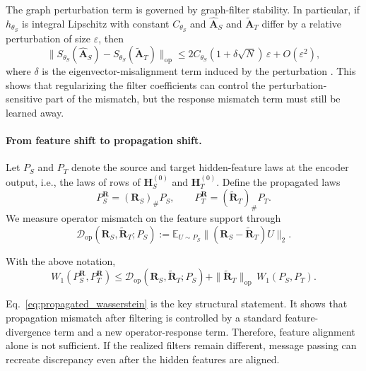 \documentclass[runningheads]{llncs}
\def\mA{{\mathbf{A}}}
\def\mH{{\mathbf{H}}}
\def\mR{{\mathbf{R}}}
\begin{document}
The graph perturbation term is governed by graph-filter stability. In particular, if $h_{\theta_S}$ is integral Lipschitz with constant $C_{\theta_S}$ and $\widehat{\mA}_S$ and $\widetilde{\mA}_T$ differ by a relative perturbation of size $\varepsilon$, then
\begin{equation}
\|S_{\theta_S}(\widehat{\mA}_S)-S_{\theta_S}(\widetilde{\mA}_T)\|_{\mathrm{op}}
\le
2C_{\theta_S}(1+\delta\sqrt{N})\,\varepsilon + O(\varepsilon^2),
\label{eq:stability_bound}
\end{equation}
where $\delta$ is the eigenvector-misalignment term induced by the perturbation \cite{gnn_stability}. This shows that regularizing the filter coefficients can control the perturbation-sensitive part of the mismatch, but the response mismatch term must still be learned away.

\paragraph{From feature shift to propagation shift.}
Let $P_S$ and $P_T$ denote the source and target hidden-feature laws at the encoder output, i.e., the laws of rows of $\mH_S^{(0)}$ and $\mH_T^{(0)}$. Define the propagated laws
\[
P_S^{\mR}=(\mR_S)_\# P_S,
\qquad
P_T^{\mR}=(\widetilde{\mR}_T)_\# P_T.
\]
We measure operator mismatch on the feature support through
\begin{equation}
\mathcal D_{\mathrm{op}}(\mR_S,\widetilde{\mR}_T;P_S)
:=
\mathbb E_{U\sim P_S}\|(\mR_S-\widetilde{\mR}_T)U\|_2.
\label{eq:operator_mismatch}
\end{equation}

\begin{proposition}
\label{prop:propagated_wasserstein}
With the above notation,
\begin{equation}
W_1(P_S^{\mR},P_T^{\mR})
\le
\mathcal D_{\mathrm{op}}(\mR_S,\widetilde{\mR}_T;P_S)
+
\|\widetilde{\mR}_T\|_{\mathrm{op}}\,W_1(P_S,P_T).
\label{eq:propagated_wasserstein}
\end{equation}
\end{proposition}

Eq.~\eqref{eq:propagated_wasserstein} is the key structural statement. It shows that propagation mismatch after filtering is controlled by a standard feature-divergence term and a new operator-response term. Therefore, feature alignment alone is not sufficient. If the realized filters remain different, message passing can recreate discrepancy even after the hidden features are aligned.
\end{document}
